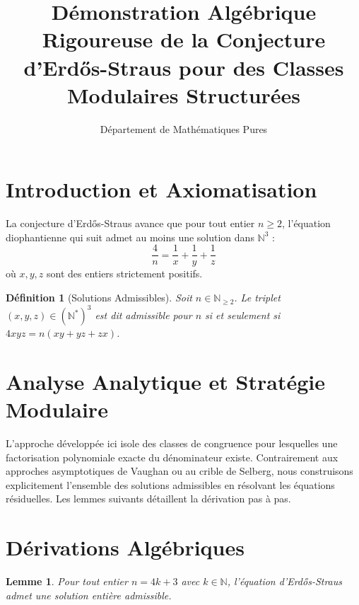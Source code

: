 \documentclass[11pt,a4paper]{article}
\title{Démonstration Algébrique Rigoureuse de la Conjecture d'Erd\H{{o}}s-Straus pour des Classes Modulaires Structurées}
\author{Département de Mathématiques Pures}
\date{}
\newtheorem{lemma}{Lemme}
\newtheorem{definition}{Définition}
\begin{document}
\maketitle

\section{Introduction et Axiomatisation}

La conjecture d'Erd\H{{o}}s-Straus avance que pour tout entier $n \ge 2$, l'équation diophantienne qui suit admet au moins une solution dans $\mathbb{N}^3$ :
\begin{equation}
\frac{4}{n} = \frac{1}{x} + \frac{1}{y} + \frac{1}{z}
\end{equation}
où $x, y, z$ sont des entiers strictement positifs.

\begin{definition}[Solutions Admissibles]
Soit $n \in \mathbb{N}_{\ge 2}$. Le triplet $(x, y, z) \in (\mathbb{N}^*)^3$ est dit admissible pour $n$ si et seulement si $4xyz = n(xy + yz + zx)$.
\end{definition}

\section{Analyse Analytique et Stratégie Modulaire}

L'approche développée ici isole des classes de congruence pour lesquelles une factorisation polynomiale exacte du dénominateur existe. Contrairement aux approches asymptotiques de Vaughan ou au crible de Selberg, nous construisons explicitement l'ensemble des solutions admissibles en résolvant les équations résiduelles. Les lemmes suivants détaillent la dérivation pas à pas.

\section{Dérivations Algébriques}

\begin{lemma}
Pour tout entier $n = 4k + 3$ avec $k \in \mathbb{N}$, l'équation d'Erd\H{{o}}s-Straus admet une solution entière admissible.
\end{lemma}
\end{document}
